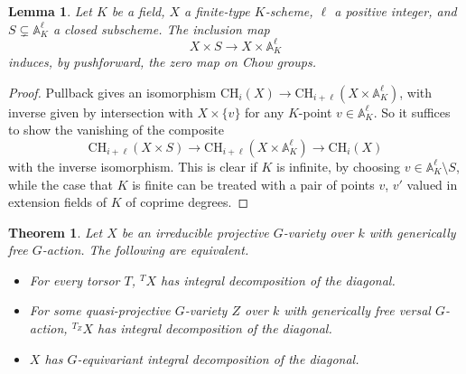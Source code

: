 \documentclass[12pt, reqno]{amsart}
\numberwithin{equation}{section}
\theoremstyle{plain}
\newtheorem{theo}[prop]{Theorem}
\newtheorem{lemm}[prop]{Lemma}
\theoremstyle{definition}
\def\bA{{\mathbb A}}
\def\CH{\mathrm{CH}}
\begin{document}
\begin{lemm}
\label{lem:affinebundle}
Let $K$ be a field,
$X$ a finite-type $K$-scheme, $\ell$ a positive integer, and $S\subsetneq \bA^\ell_K$ a closed subscheme.
The inclusion map
\[ X\times S\to X\times \bA^\ell_K \]
induces, by pushforward, the zero map on Chow groups.
\end{lemm}

\begin{proof}
Pullback gives an isomorphism $\CH_i(X)\to \CH_{i+\ell}(X\times \bA^\ell_K)$, with inverse given by intersection with $X\times \{v\}$ for any $K$-point $v\in \bA^\ell_K$.
So it suffices to show the vanishing of the composite
\[ \CH_{i+\ell}(X\times S)\to \CH_{i+\ell}(X\times \bA^\ell_K)\to \CH_i(X) \]
with the inverse isomorphism.
This is clear
if $K$ is infinite, by choosing
$v\in \bA^\ell_K\setminus S$, while
the case that $K$ is finite can be treated with a pair of points $v$, $v'$ valued in extension fields of $K$ of coprime degrees.
\end{proof}

\begin{theo}
\label{thm.idodtwist}
Let $X$ be an irreducible projective $G$-variety over $k$ with generically free $G$-action.
The following are equivalent.
\begin{itemize}
\item[(i)] For every torsor $T$, ${}^TX$ has integral decomposition of the diagonal.
\item[(ii)] For some quasi-projective $G$-variety $Z$ over $k$ with generically free versal $G$-action, ${}^{T_Z}X$ has integral decomposition of the diagonal.
\item[(iii)] $X$ has $G$-equivariant integral decomposition of the diagonal.
\end{itemize}
\end{theo}
\end{document}
